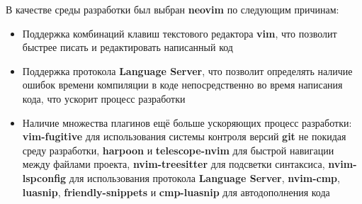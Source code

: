 В качестве среды разработки был выбран \textbf{neovim} по следующим причинам:
\begin{itemize}
    \item Поддержка комбинаций клавиш текстового редактора \textbf{vim}, что
        позволит быстрее писать и редактировать написанный код
    \item Поддержка протокола \textbf{Language Server}, что позволит определять
        наличие ошибок времени компиляции в коде непосредственно во время
        написания кода, что ускорит процесс разработки
    \item Наличие множества плагинов ещё больше ускоряющих процесс разработки:
        \textbf{vim-fugitive} для использования системы контроля версий
        \textbf{git} не покидая среду разработки, \textbf{harpoon} и
        \textbf{telescope-nvim} для быстрой навигации между файлами проекта,
        \textbf{nvim-treesitter} для подсветки синтаксиса,
        \textbf{nvim-lspconfig} для использования протокола \textbf{Language
        Server}, \textbf{nvim-cmp}, \textbf{luasnip},
        \textbf{friendly-snippets} и \textbf{cmp-luasnip} для автодополнения
        кода
\end{itemize}

